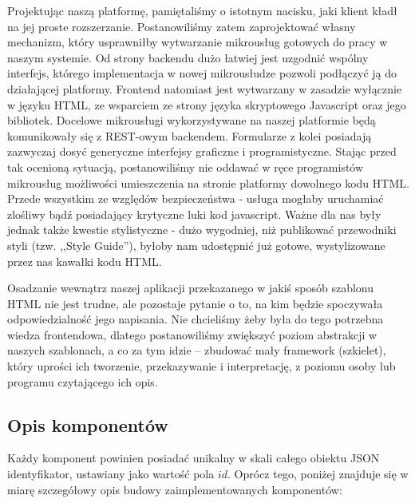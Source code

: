 \documentclass[licencjacka]{pracamgr}
\begin{document}
Projektując naszą platformę, pamiętaliśmy o istotnym nacisku, jaki klient kładł na jej proste rozszerzanie.
Postanowiliśmy zatem zaprojektować własny mechanizm, który usprawniłby wytwarzanie mikrousług gotowych do pracy w naszym systemie.
Od strony backendu dużo łatwiej jest uzgodnić wspólny interfejs, którego implementacja w nowej mikrousłudze pozwoli podłączyć ją do działającej platformy.
Frontend natomiast jest wytwarzany w zasadzie wyłącznie w języku HTML, ze wsparciem ze strony języka skryptowego Javascript oraz jego bibliotek.
Docelowe mikrousługi wykorzystywane na naszej platformie będą komunikowały się z REST-owym backendem.
Formularze z kolei posiadają zazwyczaj dosyć generyczne interfejsy graficzne i programistyczne.
Stając przed tak ocenioną sytuacją, postanowiliśmy nie oddawać w ręce programistów mikrousług możliwości umieszczenia na stronie platformy dowolnego kodu HTML.
Przede wszystkim ze względów bezpieczeństwa - usługa mogłaby uruchamiać zlośliwy bądź posiadający krytyczne luki kod javascript.
Ważne dla nas były jednak także kwestie stylistyczne - dużo wygodniej, niż publikować przewodniki styli (tzw. ,,Style Guide''),
byłoby nam udostępnić już gotowe, wystylizowane przez nas kawałki kodu HTML.

Osadzanie wewnątrz naszej aplikacji przekazanego w jakiś sposób szablonu HTML nie jest trudne, ale pozostaje pytanie o to,
na kim będzie spoczywała odpowiedzialność jego napisania. Nie chcieliśmy
żeby była do tego potrzebna wiedza frontendowa,
dlatego postanowiliśmy zwiększyć poziom abstrakcji w naszych szablonach,
a co za tym idzie -- zbudować mały framework (szkielet),
który uprości ich tworzenie, przekazywanie i interpretację, z poziomu osoby lub programu czytającego ich opis.

\subsection{Opis komponentów}

Każdy komponent powinien posiadać unikalny w skali całego obiektu JSON identyfikator, ustawiany jako wartość pola $id$. Oprócz tego, poniżej znajduje się w miarę szczegółowy opis budowy zaimplementowanych komponentów: \\
\end{document}

